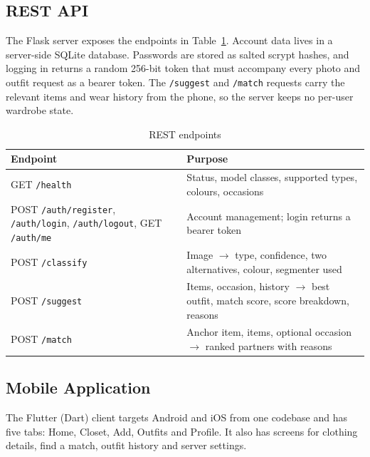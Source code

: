 \documentclass[conference]{IEEEtran}
\begin{document}
\subsection{REST API}
The Flask server exposes the endpoints in Table~\ref{tab:api}. Account data lives in a server-side SQLite database. Passwords are stored as salted scrypt hashes, and logging in returns a random 256-bit token that must accompany every photo and outfit request as a bearer token. The \texttt{/suggest} and \texttt{/match} requests carry the relevant items and wear history from the phone, so the server keeps no per-user wardrobe state.

\begin{table}[t]
\caption{REST endpoints}
\label{tab:api}
\centering
\begin{tabular}{>{\raggedright\arraybackslash}p{2.6cm}>{\raggedright\arraybackslash}p{5.1cm}}
\toprule
Endpoint & Purpose \\
\midrule
GET \texttt{/health} & Status, model classes, supported types, colours, occasions \\
POST \texttt{/auth/register}, \texttt{/auth/login}, \texttt{/auth/logout}, GET \texttt{/auth/me} & Account management; login returns a bearer token \\
POST \texttt{/classify} & Image $\rightarrow$ type, confidence, two alternatives, colour, segmenter used \\
POST \texttt{/suggest} & Items, occasion, history $\rightarrow$ best outfit, match score, score breakdown, reasons \\
POST \texttt{/match} & Anchor item, items, optional occasion $\rightarrow$ ranked partners with reasons \\
\bottomrule
\end{tabular}
\end{table}

\subsection{Mobile Application}
The Flutter (Dart) client targets Android and iOS from one codebase and has five tabs: Home, Closet, Add, Outfits and Profile. It also has screens for clothing details, find a match, outfit history and server settings.
\end{document}
